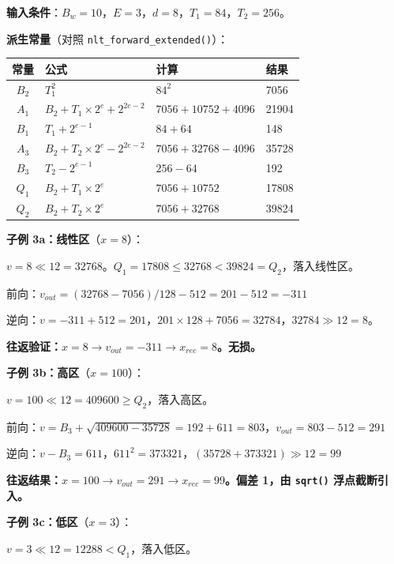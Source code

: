 \begin{examplebox}[title={例 3：NLT Extended（扩展三段式变换）}]

\textbf{输入条件}：$B_w = 10$，$E = 3$，$d = 8$，$T_1 = 84$，$T_2 = 256$。

\medskip
\textbf{派生常量}（对照 \texttt{nlt\_forward\_extended()}）：

\begin{tabular}{@{}clll@{}}
\toprule
常量 & 公式 & 计算 & 结果 \\
\midrule
$B_2$ & $T_1^2$ & $84^2$ & 7056 \\
$A_1$ & $B_2 + T_1 \times 2^e + 2^{2e-2}$ & $7056 + 10752 + 4096$ & 21904 \\
$B_1$ & $T_1 + 2^{e-1}$ & $84 + 64$ & 148 \\
$A_3$ & $B_2 + T_2 \times 2^e - 2^{2e-2}$ & $7056 + 32768 - 4096$ & 35728 \\
$B_3$ & $T_2 - 2^{e-1}$ & $256 - 64$ & 192 \\
$Q_1$ & $B_2 + T_1 \times 2^e$ & $7056 + 10752$ & 17808 \\
$Q_2$ & $B_2 + T_2 \times 2^e$ & $7056 + 32768$ & 39824 \\
\bottomrule
\end{tabular}

\medskip
\textbf{子例 3a：线性区}（$x = 8$）：

$v = 8 \ll 12 = 32768$。$Q_1 = 17808 \leq 32768 < 39824 = Q_2$，落入线性区。

前向：$v_{\mathit{out}} = (32768 - 7056) / 128 - 512 = 201 - 512 = -311$

逆向：$v = -311 + 512 = 201$，$201 \times 128 + 7056 = 32784$，$32784 \gg 12 = 8$。

\textbf{往返验证：$x = 8 \to v_{\mathit{out}} = -311 \to x_{\mathit{rec}} = 8$。无损。}

\medskip
\textbf{子例 3b：高区}（$x = 100$）：

$v = 100 \ll 12 = 409600 \geq Q_2$，落入高区。

前向：$v = B_3 + \sqrt{409600 - 35728} = 192 + 611 = 803$，$v_{\mathit{out}} = 803 - 512 = 291$

逆向：$v - B_3 = 611$，$611^2 = 373321$，$(35728 + 373321) \gg 12 = 99$

\textbf{往返结果：$x = 100 \to v_{\mathit{out}} = 291 \to x_{\mathit{rec}} = 99$。偏差 1，由 \texttt{sqrt()} 浮点截断引入。}

\medskip
\textbf{子例 3c：低区}（$x = 3$）：

$v = 3 \ll 12 = 12288 < Q_1$，落入低区。


\end{examplebox}
